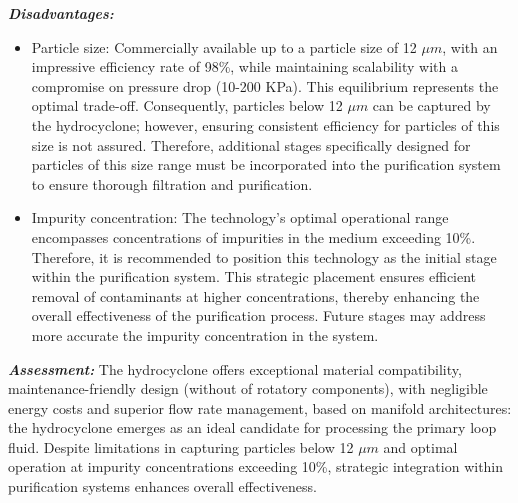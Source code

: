 \begin{tcolorbox}[colback=blue!5!white,enhanced,breakable,colframe=blue!75!black,title=Hydrocyclone]
 	\textbf{\textit{Disadvantages:}}
 	
 	\begin{itemize}
 		\item Particle size: Commercially available up to a particle size of 12 $\mu m$, with an impressive efficiency rate of 98\%, while maintaining scalability with a compromise on pressure drop (10-200 KPa). This equilibrium represents the optimal trade-off. Consequently, particles below 12 $\mu m$ can be captured by the hydrocyclone; however, ensuring consistent efficiency for particles of this size is not assured. Therefore, additional stages specifically designed for particles of this size range must be incorporated into the purification system to ensure thorough filtration and purification.
 		\item Impurity concentration: The technology's optimal operational range encompasses concentrations of impurities in the medium exceeding 10\%. Therefore, it is recommended to position this technology as the initial stage within the purification system. This strategic placement ensures efficient removal of contaminants at higher concentrations, thereby enhancing the overall effectiveness of the purification process. Future stages may address more accurate the impurity concentration in the system.
 	\end{itemize}
 	
 	\textbf{\textit{Assessment:}} The hydrocyclone offers exceptional material compatibility, maintenance-friendly design (without of rotatory components), with negligible energy costs and superior flow rate management, based on manifold architectures: the hydrocyclone emerges as an ideal candidate for processing the primary loop fluid. Despite limitations in capturing particles below 12 $\mu m$ and optimal operation at impurity concentrations exceeding 10\%, strategic integration within purification systems enhances overall effectiveness.
 	
 \end{tcolorbox}
